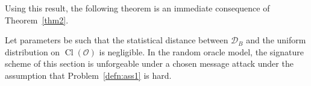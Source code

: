 \documentclass{llncs}
\newcommand{\D}{\mathcal{D}}
\newcommand{\E}{\mathcal{E}}
\newcommand{\OO}{\mathcal{O}}
\DeclareMathOperator{\Cl}{Cl}
\newcommand{\msg}{\mathsf{msg}}
\renewcommand{\a}{\mathfrak{a}}
\renewcommand{\b}{\mathfrak{b}}
\renewcommand{\c}{\mathfrak{c}}
\renewcommand{\l}{\mathfrak{l}}
\begin{document}
Using this result, the following theorem is an immediate consequence of Theorem~\ref{thm2}.

\begin{theorem}
Let parameters be such that the statistical distance between $\D_B$ and the uniform distribution on $\Cl(\OO)$ is negligible.
In the random oracle model, the signature scheme of this section is unforgeable under a chosen message attack under the assumption that Problem~\ref{defn:ass1} is hard.
\end{theorem}


%
%
%
%
\end{document}
